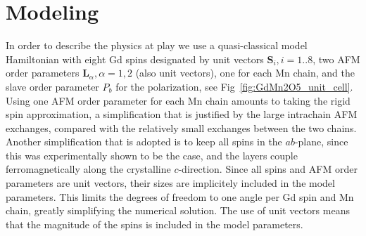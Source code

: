 \section{Modeling}
In order to describe the physics at play we use a quasi-classical model Hamiltonian with eight Gd spins designated by unit vectors $\mathbf{S}_i, i=1..8$, two AFM order parameters $\mathbf{L}_\alpha, \alpha=1,2$ (also unit vectors), one for each Mn chain, and the slave order parameter $P_b$ for the polarization, see Fig~\ref{fig:GdMn2O5_unit_cell}.
Using one AFM order parameter for each Mn chain amounts to taking the rigid spin approximation, a simplification that is justified by the large intrachain AFM exchanges, compared with the relatively small exchanges between the two chains.
Another simplification that is adopted is to keep all spins in the $ab$-plane, since this was experimentally shown to be the case, and the layers couple ferromagnetically along the crystalline $c$-direction\cite{Lee13}. Since all spins and AFM order parameters are unit vectors, their sizes are implicitely included in the model parameters.
This limits the degrees of freedom to one angle per Gd spin and Mn chain, greatly simplifying the numerical solution.
The use of unit vectors means that the magnitude of the spins is included in the model parameters.

